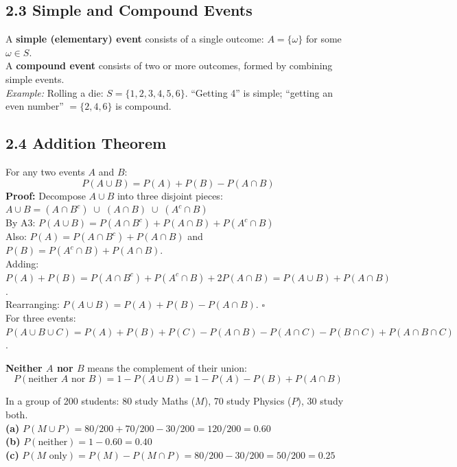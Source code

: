 \documentclass[12pt]{article}
\begin{document}
\subsection{2.3 Simple and Compound Events}

\begin{defbox}
A \textbf{simple (elementary) event} consists of a single outcome: $A=\{\omega\}$ for some $\omega\in S$.\\[4pt]
A \textbf{compound event} consists of two or more outcomes, formed by combining simple events.\\[4pt]
\textit{Example:} Rolling a die: $S=\{1,2,3,4,5,6\}$. ``Getting 4'' is simple; ``getting an even number'' $=\{2,4,6\}$ is compound.
\end{defbox}

\subsection{2.4 Addition Theorem}

\begin{thmbox}
For any two events $A$ and $B$:
\[P(A\cup B) = P(A) + P(B) - P(A\cap B)\]
\textbf{Proof:} Decompose $A\cup B$ into three disjoint pieces:
$A\cup B = (A\cap B^c)\;\cup\;(A\cap B)\;\cup\;(A^c\cap B)$\\
By A3: $P(A\cup B)=P(A\cap B^c)+P(A\cap B)+P(A^c\cap B)$\\
Also: $P(A)=P(A\cap B^c)+P(A\cap B)$ and $P(B)=P(A^c\cap B)+P(A\cap B)$.\\
Adding: $P(A)+P(B)=P(A\cap B^c)+P(A^c\cap B)+2P(A\cap B)=P(A\cup B)+P(A\cap B)$.\\
Rearranging: $P(A\cup B)=P(A)+P(B)-P(A\cap B)$. \hfill$\square$\\[4pt]
For three events: $P(A\cup B\cup C)=P(A)+P(B)+P(C)-P(A\cap B)-P(A\cap C)-P(B\cap C)+P(A\cap B\cap C)$.
\end{thmbox}

\begin{keybox}
\textbf{Neither $A$ nor $B$} means the complement of their union:
\[P(\text{neither }A\text{ nor }B) = 1 - P(A\cup B) = 1-P(A)-P(B)+P(A\cap B)\]
\end{keybox}

\begin{examplebox}
In a group of 200 students: 80 study Maths ($M$), 70 study Physics ($P$), 30 study both.\\[4pt]
\textbf{(a)} $P(M\cup P)=80/200+70/200-30/200=120/200=0.60$\\
\textbf{(b)} $P(\text{neither})=1-0.60=0.40$\\
\textbf{(c)} $P(M\text{ only})=P(M)-P(M\cap P)=80/200-30/200=50/200=0.25$
\end{examplebox}
\end{document}
